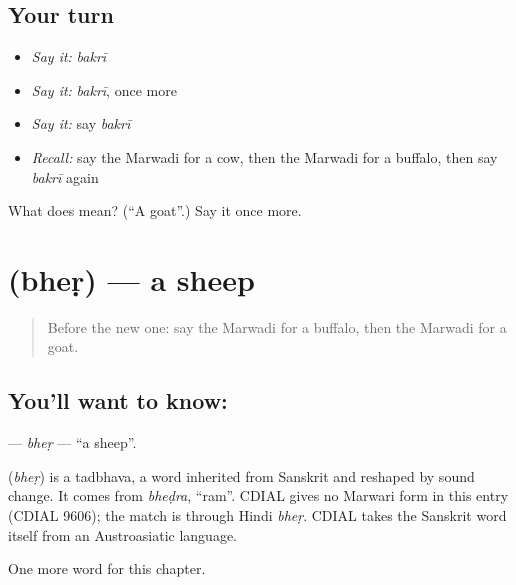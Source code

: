 \subsection*{Your turn}
\begin{itemize}
\raggedright
  \item \emph{Say it:} \emph{bakrī}
  \item \emph{Say it:} \emph{bakrī}, once more
  \item \emph{Say it:} say \emph{bakrī}
  \item \emph{Recall:} say the Marwadi for a cow, then the Marwadi for a buffalo, then say \emph{bakrī} again
\end{itemize}

\begin{tcolorbox}[breakable,colback=teal!4,colframe=teal!35!black,title={Before you move on}]
What does  mean? (\textquotedblleft{}A goat\textquotedblright{}.) Say it once more.
\end{tcolorbox}
\section[\texorpdfstring{\mw{भेड़} (bheṛ)}{भेड़ (bheṛ)}]{ (bheṛ) — a sheep}

\label{lesson:MW-C71-bher}



\begin{quote}
Before the new one: say the Marwadi for a buffalo, then the Marwadi for a goat.
\end{quote}

\subsection*{You'll want to know: }
\textbf{} — \emph{bheṛ} — \textquotedblleft{}a sheep\textquotedblright{}.

\begin{cousinweb}
\textbf{} (\emph{bheṛ}) is a tadbhava, a word inherited from Sanskrit and reshaped by sound change. It comes from \emph{bheḍra}, \textquotedblleft{}ram\textquotedblright{}. CDIAL gives no Marwari form in this entry (CDIAL 9606); the match is through Hindi \emph{bheṛ}. CDIAL takes the Sanskrit word itself from an Austroasiatic language.
\end{cousinweb}

\begin{grammarlens}[title={What you've built}]
One more word for this chapter.
\end{grammarlens}


